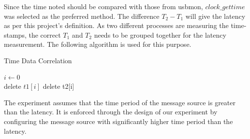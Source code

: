 Since the time noted should be compared with those from usbmon, $clock\_{gettime}$ was selected as the preferred method. 
The difference $T_2 - T_1$ will give the latency as per this project's definition.
As two different processes are measuring the time-stamps, the correct $T_1$ and $T_2$ needs to be grouped together for the latency measurement. 
The following algorithm is used for this purpose.

\begin{algorithm}[!h]
\caption{Time Data Correlation}
\begin{algorithmic}
\State $i \gets 0$
 \\
\hspace{1.35cm} delete $t1[i]$
delete t2[i]
\EndIf
\EndFor
\end{algorithmic}
\end{algorithm}
The experiment assumes that the time period of the message source is greater than the latency.
It is enforced through the design of our experiment by configuring the message source with significantly higher time period than the latency.\\

